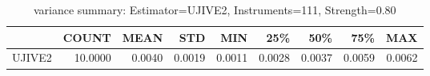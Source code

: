 \begin{table}[ht]
\centering
\caption{variance summary: Estimator=UJIVE2, Instruments=111, Strength=0.80}
\begin{tabular}{lrrrrrrrr}
\toprule
 & COUNT & MEAN & STD & MIN & 25\% & 50\% & 75\% & MAX \\
\midrule
UJIVE2 & 10.0000 & 0.0040 & 0.0019 & 0.0011 & 0.0028 & 0.0037 & 0.0059 & 0.0062 \\
\bottomrule
\end{tabular}
\end{table}
